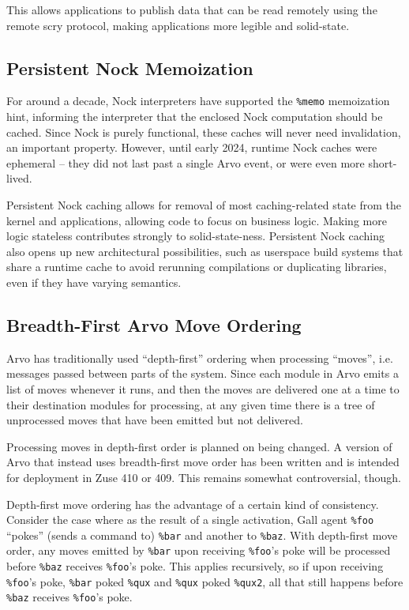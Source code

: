 \documentclass[twoside]{article}
\begin{document}
This allows applications to publish data that can be read remotely using the remote scry protocol, making applications more legible and solid-state.

\subsection{Persistent Nock Memoization}

For around a decade, Nock interpreters have supported the \lstinline[style=inlinecode]{%memo} memoization hint, informing the interpreter that the enclosed Nock computation should be cached.  Since Nock is purely functional, these caches will never need invalidation, an important property.  However, until early 2024, runtime Nock caches were ephemeral – they did not last past a single Arvo event, or were even more short-lived.

Persistent Nock caching allows for removal of most caching-related state from the kernel and applications, allowing code to focus on business logic.  Making more logic stateless contributes strongly to solid-state-ness.  Persistent Nock caching also opens up new architectural possibilities, such as userspace build systems that share a runtime cache to avoid rerunning compilations or duplicating libraries, even if they have varying semantics.

\subsection{Breadth-First Arvo Move Ordering}

Arvo has traditionally used ``depth-first'' ordering when processing ``moves'', i.e. messages passed between parts of the system.  Since each module in Arvo emits a list of moves whenever it runs, and then the moves are delivered one at a time to their destination modules for processing, at any given time there is a tree of unprocessed moves that have been emitted but not delivered.

Processing moves in depth-first order is planned on being changed.  A version of Arvo that instead uses breadth-first move order has been written and is intended for deployment in Zuse 410 or 409.  This remains somewhat controversial, though.

Depth-first move ordering has the advantage of a certain kind of consistency.  Consider the case where as the result of a single activation, Gall agent \lstinline[style=inlinecode]{%foo} ``pokes'' (sends a command to) \lstinline[style=inlinecode]{%bar} and another to \lstinline[style=inlinecode]{%baz}.  With depth-first move order, any moves emitted by \lstinline[style=inlinecode]{%bar} upon receiving \lstinline[style=inlinecode]{%foo}'s poke will be processed before \lstinline[style=inlinecode]{%baz} receives \lstinline[style=inlinecode]{%foo}'s poke.  This applies recursively, so if upon receiving \lstinline[style=inlinecode]{%foo}'s poke, \lstinline[style=inlinecode]{%bar} poked \lstinline[style=inlinecode]{%qux} and \lstinline[style=inlinecode]{%qux} poked \lstinline[style=inlinecode]{%qux2}, all that still happens before \lstinline[style=inlinecode]{%baz} receives \lstinline[style=inlinecode]{%foo}'s poke.
\end{document}
